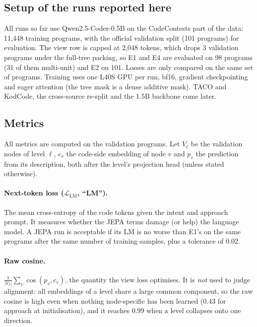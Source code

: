 \documentclass[11pt]{article}
\newcommand{\Lcal}{\mathcal{L}}
\begin{document}
\subsection{Setup of the runs reported here}
\label{sec:exp-setup}

All runs so far use Qwen2.5-Coder-0.5B on the CodeContests part of the data: 11{,}448 training programs, with the
official validation split (101 programs) for evaluation. The view row is capped at 2{,}048 tokens, which drops 3
validation programs under the full-tree packing, so E1 and E4 are evaluated on 98 programs (31 of them multi-unit)
and E2 on 101. Losses are only compared on the same set of programs. Training uses one L40S GPU per run, bf16,
gradient checkpointing and eager attention (the tree mask is a dense additive mask). TACO and KodCode, the
cross-source re-split and the 1.5B backbone come later.

\subsection{Metrics}
\label{sec:metrics}

All metrics are computed on the validation programs. Let $V_\ell$ be the validation nodes of level $\ell$, $c_v$ the
code-side embedding of node $v$ and $p_v$ the prediction from its description, both after the level's projection
head (unless stated otherwise).

\paragraph{Next-token loss ($\Lcal_{\text{LM}}$, ``LM'').}
The mean cross-entropy of the code tokens given the intent and approach prompt. It measures whether the JEPA terms
damage (or help) the language model. A JEPA run is acceptable if its LM is no worse than E1's on the same programs
after the same number of training samples, plus a tolerance of 0.02.

\paragraph{Raw cosine.} $\frac{1}{|V_\ell|}\sum_{v}\cos(p_v,c_v)$, the quantity the view loss optimises. It is
\emph{not} used to judge alignment: all embeddings of a level share a large common component, so the raw cosine is
high even when nothing node-specific has been learned (0.43 for approach at initialisation), and it reaches 0.99 when
a level collapses onto one direction.
\end{document}

